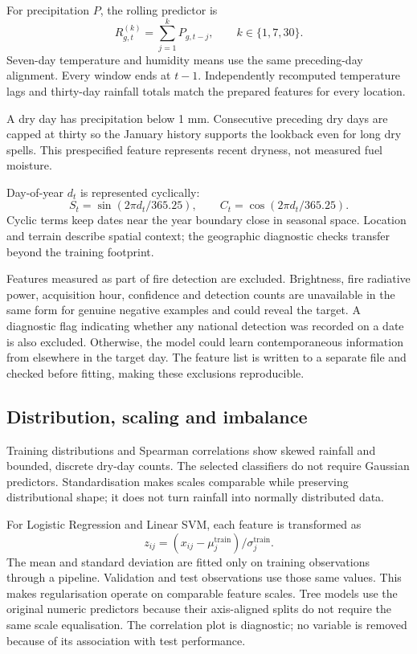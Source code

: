 \documentclass[conference,a4paper]{IEEEtran}
\begin{document}
For precipitation $P$, the rolling predictor is
\begin{equation}
R^{(k)}_{g,t}=\sum_{j=1}^{k}P_{g,t-j},\qquad k\in\{1,7,30\}.
\end{equation}
Seven-day temperature and humidity means use the same preceding-day alignment. Every window ends at $t-1$. Independently recomputed temperature lags and thirty-day rainfall totals match the prepared features for every location.

A dry day has precipitation below 1 mm. Consecutive preceding dry days are capped at thirty so the January history supports the lookback even for long dry spells. This prespecified feature represents recent dryness, not measured fuel moisture.

Day-of-year $d_t$ is represented cyclically:
\begin{equation}
S_t=\sin(2\pi d_t/365.25),\qquad C_t=\cos(2\pi d_t/365.25).
\end{equation}
Cyclic terms keep dates near the year boundary close in seasonal space. Location and terrain describe spatial context; the geographic diagnostic checks transfer beyond the training footprint.

Features measured as part of fire detection are excluded. Brightness, fire radiative power, acquisition hour, confidence and detection counts are unavailable in the same form for genuine negative examples and could reveal the target. A diagnostic flag indicating whether any national detection was recorded on a date is also excluded. Otherwise, the model could learn contemporaneous information from elsewhere in the target day. The feature list is written to a separate file and checked before fitting, making these exclusions reproducible.

\subsection{Distribution, scaling and imbalance}
Training distributions and Spearman correlations show skewed rainfall and bounded, discrete dry-day counts. The selected classifiers do not require Gaussian predictors. Standardisation makes scales comparable while preserving distributional shape; it does not turn rainfall into normally distributed data.

For Logistic Regression and Linear SVM, each feature is transformed as
\begin{equation}
z_{ij}=(x_{ij}-\mu_j^{\mathrm{train}})/\sigma_j^{\mathrm{train}}.
\end{equation}
The mean and standard deviation are fitted only on training observations through a pipeline. Validation and test observations use those same values. This makes regularisation operate on comparable feature scales. Tree models use the original numeric predictors because their axis-aligned splits do not require the same scale equalisation. The correlation plot is diagnostic; no variable is removed because of its association with test performance.
\end{document}
